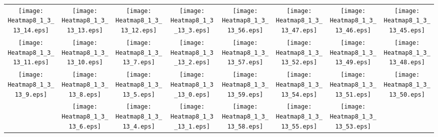 \documentclass{standalone}
\begin{document}
\begin{tabular}{ *8{c} }
\texttt{[image: Heatmap8\_1\_3\_13\_14.eps]} & \texttt{[image: Heatmap8\_1\_3\_13\_13.eps]} & \texttt{[image: Heatmap8\_1\_3\_13\_12.eps]} & \texttt{[image: Heatmap8\_1\_3\_13\_3.eps]} & \texttt{[image: Heatmap8\_1\_3\_13\_56.eps]} & \texttt{[image: Heatmap8\_1\_3\_13\_47.eps]} & \texttt{[image: Heatmap8\_1\_3\_13\_46.eps]} & \texttt{[image: Heatmap8\_1\_3\_13\_45.eps]} \\
\texttt{[image: Heatmap8\_1\_3\_13\_11.eps]} & \texttt{[image: Heatmap8\_1\_3\_13\_10.eps]} & \texttt{[image: Heatmap8\_1\_3\_13\_7.eps]} & \texttt{[image: Heatmap8\_1\_3\_13\_2.eps]} & \texttt{[image: Heatmap8\_1\_3\_13\_57.eps]} & \texttt{[image: Heatmap8\_1\_3\_13\_52.eps]} & \texttt{[image: Heatmap8\_1\_3\_13\_49.eps]} & \texttt{[image: Heatmap8\_1\_3\_13\_48.eps]} \\
\texttt{[image: Heatmap8\_1\_3\_13\_9.eps]} & \texttt{[image: Heatmap8\_1\_3\_13\_8.eps]} & \texttt{[image: Heatmap8\_1\_3\_13\_5.eps]} & \texttt{[image: Heatmap8\_1\_3\_13\_0.eps]} & \texttt{[image: Heatmap8\_1\_3\_13\_59.eps]} & \texttt{[image: Heatmap8\_1\_3\_13\_54.eps]} & \texttt{[image: Heatmap8\_1\_3\_13\_51.eps]} & \texttt{[image: Heatmap8\_1\_3\_13\_50.eps]} \\
 & \texttt{[image: Heatmap8\_1\_3\_13\_6.eps]} & \texttt{[image: Heatmap8\_1\_3\_13\_4.eps]} & \texttt{[image: Heatmap8\_1\_3\_13\_1.eps]} & \texttt{[image: Heatmap8\_1\_3\_13\_58.eps]} & \texttt{[image: Heatmap8\_1\_3\_13\_55.eps]} & \texttt{[image: Heatmap8\_1\_3\_13\_53.eps]} &  
\end{tabular}
\end{document}
